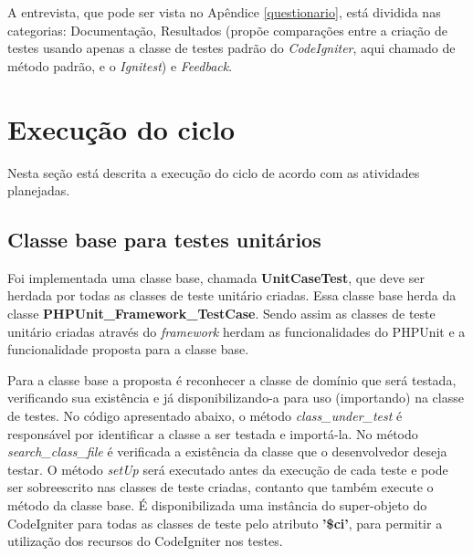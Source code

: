       A entrevista, que pode ser vista no Apêndice \ref{questionario}, está dividida nas categorias: Documentação, Resultados (propõe comparações entre a criação de testes usando apenas a classe de testes padrão do \textit{CodeIgniter}, aqui chamado de método padrão, e o \textit{Ignitest}) e \textit{Feedback}.


  \section{Execução do ciclo}

    Nesta seção está descrita a execução do ciclo de acordo com as atividades planejadas.
      
    \subsection{Classe base para testes unitários}

        Foi implementada uma classe base, chamada \textbf{UnitCaseTest}, que deve ser herdada por todas as classes de teste unitário criadas. 
        Essa classe base herda da classe \textbf{PHPUnit\_Framework\_TestCase}. Sendo assim as classes de teste unitário criadas através do \textit{framework} herdam as funcionalidades do PHPUnit e a funcionalidade proposta para a classe base.

        Para a classe base a proposta é reconhecer a classe de domínio que será testada, verificando sua existência e já disponibilizando-a para uso (importando) na classe de testes. No código apresentado abaixo, o método \textit{class\_under\_test} é responsável por identificar a classe a ser testada e importá-la. No método \textit{search\_class\_file} é verificada a existência da classe que o desenvolvedor deseja testar. O método \textit{setUp} será executado antes da execução de cada teste e pode ser sobreescrito nas classes de teste criadas, contanto que também execute o método da classe base.
        É disponibilizada uma instância do super-objeto do CodeIgniter para todas as classes de teste pelo atributo \textbf{'\$ci'},
        para permitir a utilização dos recursos do CodeIgniter nos testes.

